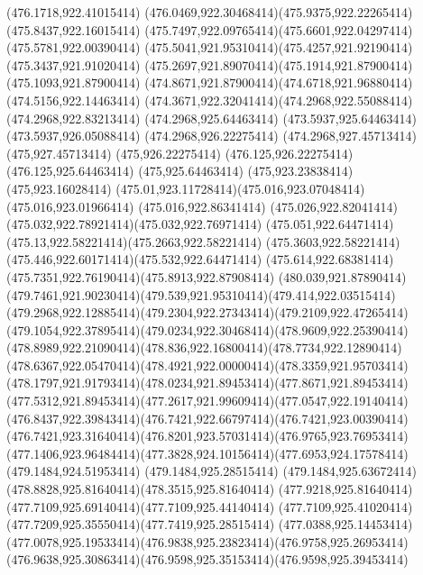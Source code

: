{{	\closepath
	\moveto(476.1718,922.41015414)
	\curveto(476.0469,922.30468414)(475.9375,922.22265414)(475.8437,922.16015414)
	\curveto(475.7497,922.09765414)(475.6601,922.04297414)(475.5781,922.00390414)
	\curveto(475.5041,921.95310414)(475.4257,921.92190414)(475.3437,921.91020414)
	\curveto(475.2697,921.89070414)(475.1914,921.87900414)(475.1093,921.87900414)
	\curveto(474.8671,921.87900414)(474.6718,921.96880414)(474.5156,922.14463414)
	\curveto(474.3671,922.32041414)(474.2968,922.55088414)(474.2968,922.83213414)
	\lineto(474.2968,925.64463414)
	\lineto(473.5937,925.64463414)
	\lineto(473.5937,926.05088414)
	\lineto(474.2968,926.22275414)
	\lineto(474.2968,927.45713414)
	\lineto(475,927.45713414)
	\lineto(475,926.22275414)
	\lineto(476.125,926.22275414)
	\lineto(476.125,925.64463414)
	\lineto(475,925.64463414)
	\lineto(475,923.23838414)
	\lineto(475,923.16028414)
	\curveto(475.01,923.11728414)(475.016,923.07048414)(475.016,923.01966414)
	\lineto(475.016,922.86341414)
	\curveto(475.026,922.82041414)(475.032,922.78921414)(475.032,922.76971414)
	\curveto(475.051,922.64471414)(475.13,922.58221414)(475.2663,922.58221414)
	\curveto(475.3603,922.58221414)(475.446,922.60171414)(475.532,922.64471414)
	\curveto(475.614,922.68381414)(475.7351,922.76190414)(475.8913,922.87908414)
	\closepath
	\moveto(480.039,921.87890414)
	\curveto(479.7461,921.90230414)(479.539,921.95310414)(479.414,922.03515414)
	\curveto(479.2968,922.12885414)(479.2304,922.27343414)(479.2109,922.47265414)
	\curveto(479.1054,922.37895414)(479.0234,922.30468414)(478.9609,922.25390414)
	\curveto(478.8989,922.21090414)(478.836,922.16800414)(478.7734,922.12890414)
	\curveto(478.6367,922.05470414)(478.4921,922.00000414)(478.3359,921.95703414)
	\curveto(478.1797,921.91793414)(478.0234,921.89453414)(477.8671,921.89453414)
	\curveto(477.5312,921.89453414)(477.2617,921.99609414)(477.0547,922.19140414)
	\curveto(476.8437,922.39843414)(476.7421,922.66797414)(476.7421,923.00390414)
	\curveto(476.7421,923.31640414)(476.8201,923.57031414)(476.9765,923.76953414)
	\curveto(477.1406,923.96484414)(477.3828,924.10156414)(477.6953,924.17578414)
	\lineto(479.1484,924.51953414)
	\lineto(479.1484,925.28515414)
	\curveto(479.1484,925.63672414)(478.8828,925.81640414)(478.3515,925.81640414)
	\curveto(477.9218,925.81640414)(477.7109,925.69140414)(477.7109,925.44140414)
	\curveto(477.7109,925.41020414)(477.7209,925.35550414)(477.7419,925.28515414)
	\lineto(477.0388,925.14453414)
	\curveto(477.0078,925.19533414)(476.9838,925.23823414)(476.9758,925.26953414)
	\curveto(476.9638,925.30863414)(476.9598,925.35153414)(476.9598,925.39453414)
}}
